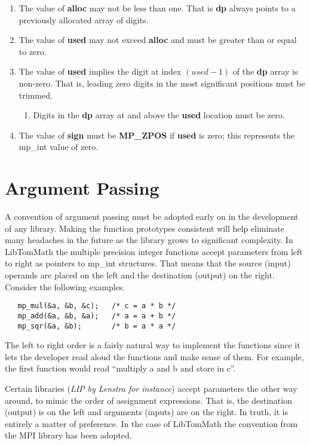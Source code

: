 \documentclass[b5paper]{book}
\begin{document}
\begin{enumerate}
\item The value of \textbf{alloc} may not be less than one.  That is \textbf{dp} always points to a previously allocated
array of digits.
\item The value of \textbf{used} may not exceed \textbf{alloc} and must be greater than or equal to zero.
\item The value of \textbf{used} implies the digit at index $(used - 1)$ of the \textbf{dp} array is non-zero.  That is, 
leading zero digits in the most significant positions must be trimmed.
   \begin{enumerate}
   \item Digits in the \textbf{dp} array at and above the \textbf{used} location must be zero.
   \end{enumerate}
\item The value of \textbf{sign} must be \textbf{MP\_ZPOS} if \textbf{used} is zero; 
this represents the mp\_int value of zero.
\end{enumerate}

\section{Argument Passing}
A convention of argument passing must be adopted early on in the development of any library.  Making the function 
prototypes consistent will help eliminate many headaches in the future as the library grows to significant complexity.  
In LibTomMath the multiple precision integer functions accept parameters from left to right as pointers to mp\_int 
structures.  That means that the source (input) operands are placed on the left and the destination (output) on the right.   
Consider the following examples.

\begin{verbatim}
   mp_mul(&a, &b, &c);   /* c = a * b */
   mp_add(&a, &b, &a);   /* a = a + b */
   mp_sqr(&a, &b);       /* b = a * a */
\end{verbatim}

The left to right order is a fairly natural way to implement the functions since it lets the developer read aloud the
functions and make sense of them.  For example, the first function would read ``multiply a and b and store in c''.

Certain libraries (\textit{LIP by Lenstra for instance}) accept parameters the other way around, to mimic the order
of assignment expressions.  That is, the destination (output) is on the left and arguments (inputs) are on the right.  In 
truth, it is entirely a matter of preference.  In the case of LibTomMath the convention from the MPI library has been 
adopted.  
\end{document}
